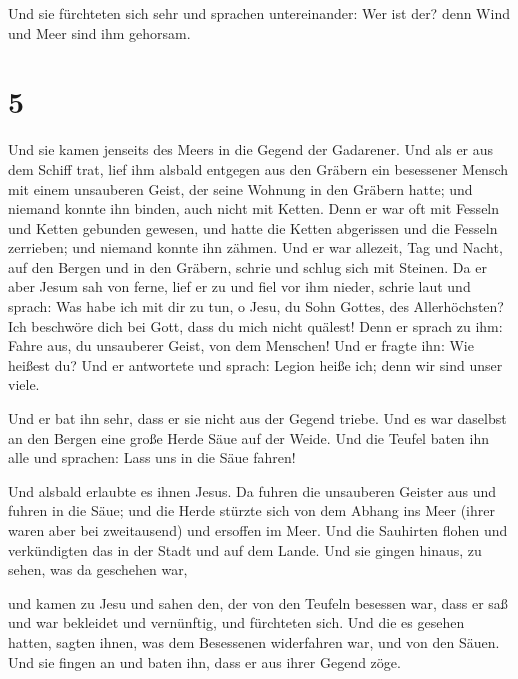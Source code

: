  Und sie fürchteten sich sehr und sprachen untereinander:
Wer ist der? denn Wind und Meer sind ihm gehorsam.

\hypertarget{section-4}{%
\section{5}\label{section-4}}

 Und sie kamen jenseits des Meers in die Gegend der
Gadarener.  Und als er aus dem Schiff trat, lief ihm
alsbald entgegen aus den Gräbern ein besessener Mensch mit einem
unsauberen Geist,  der seine Wohnung in den Gräbern hatte;
und niemand konnte ihn binden, auch nicht mit Ketten. 
Denn er war oft mit Fesseln und Ketten gebunden gewesen, und hatte die
Ketten abgerissen und die Fesseln zerrieben; und niemand konnte ihn
zähmen.  Und er war allezeit, Tag und Nacht, auf den
Bergen und in den Gräbern, schrie und schlug sich mit Steinen.
 Da er aber Jesum sah von ferne, lief er zu und fiel vor
ihm nieder, schrie laut und sprach:  Was habe ich mit dir
zu tun, o Jesu, du Sohn Gottes, des Allerhöchsten? Ich beschwöre dich
bei Gott, dass du mich nicht quälest!  Denn er sprach zu
ihm: Fahre aus, du unsauberer Geist, von dem Menschen! 
Und er fragte ihn: Wie heißest du? Und er antwortete und sprach: Legion
heiße ich; denn wir sind unser viele.

 Und er bat ihn sehr, dass er sie nicht aus der Gegend
triebe.  Und es war daselbst an den Bergen eine große
Herde Säue auf der Weide.  Und die Teufel baten ihn alle
und sprachen: Lass uns in die Säue fahren!

 Und alsbald erlaubte es ihnen Jesus. Da fuhren die
unsauberen Geister aus und fuhren in die Säue; und die Herde stürzte
sich von dem Abhang ins Meer (ihrer waren aber bei zweitausend) und
ersoffen im Meer.  Und die Sauhirten flohen und
verkündigten das in der Stadt und auf dem Lande. Und sie gingen hinaus,
zu sehen, was da geschehen war,

 und kamen zu Jesu und sahen den, der von den Teufeln
besessen war, dass er saß und war bekleidet und vernünftig, und
fürchteten sich.  Und die es gesehen hatten, sagten
ihnen, was dem Besessenen widerfahren war, und von den Säuen.
 Und sie fingen an und baten ihn, dass er aus ihrer
Gegend zöge.

